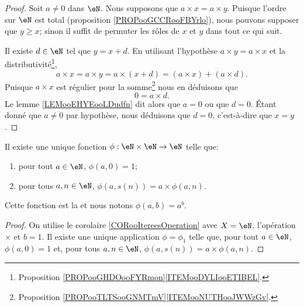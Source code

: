\begin{proof}
	Soit \( a\neq 0\) dans \( \eN\). Nous supposons que \( a\times x=a\times y\). Puisque l'ordre sur \( \eN\) est total (proposition \ref{PROPooGCCRooFBYrlo}), nous pouvons supposer que \( y\geq x\); sinon il suffit de permuter les rôles de \( x\) et \( y\) dans tout ce qui suit.

	Il existe \( d\in \eN\) tel que \( y=x+d\). En utilisant l'hypothèse \( a\times y=a\times x\) et la distributivité\footnote{Proposition \ref{PROPooGHDOooFYRmon}\ref{ITEMooDYLIooETIBEL}.},
	\begin{equation}
		a\times x=a\times y=a\times (x+d)=(a\times x)+(a\times d).
	\end{equation}
	Puisque \( a\times x \) est régulier pour la somme\footnote{Proposition \ref{PROPooTLTSooGNMTmV}\ref{ITEMooNUTHooJWWzGv}.} nous en déduisons que
	\begin{equation}
		0=a\times d.
	\end{equation}
	Le lemme \ref{LEMooEHYEooLDudfn} dit alors que \( a=0\) ou que \( d=0\). Étant donné que \( a\neq 0\) par hypothèse, nous déduisons que \( d=0\), c'est-à-dire que \( x=y\).
\end{proof}

\begin{propositionDef}	\label{PROPooDEFPuissanceEntiers}
	Il existe une unique fonction \( \phi : \eN \times \eN \to \eN \) telle que:
 	\begin{enumerate}
  		\item
			pour tout \( a \in \eN\), \( \phi(a,0) = 1 \);
   		\item
	 		pour tous \( a, n \in \eN\), \( \phi(a,s(n)) = a \times \phi(a,n) \).
	\end{enumerate}
Cette fonction est la  et nous notons \( \phi (a,b)=a^b\).
\end{propositionDef}

\begin{proof}
	On utilise le corolaire \ref{CORooItereesOperation} avec \( X = \eN \), l'opération \( \times \) et \( b = 1 \). Il existe une unique application \( \phi = \phi_1 \) telle que, pour tout \( a \in \eN \), \( \phi (a,0) = 1 \) et, pour tous \(a, n \in \eN \), \( \phi(a, s(n)) = a \times \phi(a, n) \).
\end{proof}

